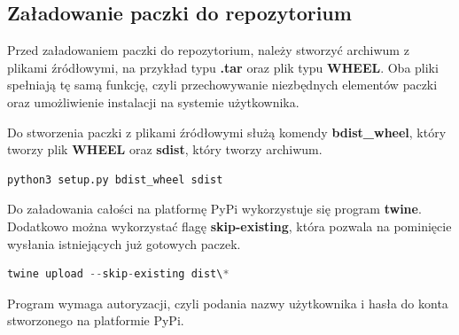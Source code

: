 \subsection{Załadowanie paczki do repozytorium}

\quad Przed załadowaniem paczki do repozytorium, należy stworzyć archiwum z plikami źródłowymi, na przykład typu \textbf{.tar} oraz plik typu \textbf{WHEEL}. Oba pliki spełniają tę samą funkcję, czyli przechowywanie niezbędnych elementów paczki oraz umożliwienie instalacji na systemie użytkownika.

\quad Do stworzenia paczki z plikami źródłowymi służą komendy \textbf{bdist\_wheel}, który tworzy plik \textbf{WHEEL} oraz \textbf{sdist}, który tworzy archiwum. \newline

\begin{lstlisting}[language=python, style=command, captionpos=b, caption={Przygotowanie plików źródłowych}]
python3 setup.py bdist_wheel sdist
\end{lstlisting}

\quad Do załadowania całości na platformę PyPi wykorzystuje się program \textbf{twine}. Dodatkowo można wykorzystać flagę \textbf{skip-existing}, która pozwala na pominięcie wysłania istniejących już gotowych paczek.\newline

\begin{lstlisting}[language=python, style=command, captionpos=b, caption={Wysłanie paczki na repozytorium}]
twine upload --skip-existing dist\*
\end{lstlisting}

\quad Program wymaga autoryzacji, czyli podania nazwy użytkownika i hasła do konta stworzonego na platformie PyPi. 